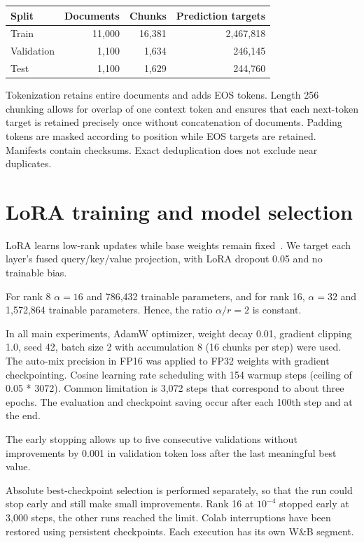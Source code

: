 \documentclass[10pt,a4paper,twocolumn]{article}
\begin{document}
\begin{center}
\begin{tabular}{@{}lrrr@{}}
\toprule
Split & Documents & Chunks & Prediction targets\\
\midrule
Train & 11,000 & 16,381 & 2,467,818\\
Validation & 1,100 & 1,634 & 246,145\\
Test & 1,100 & 1,629 & 244,760\\
\bottomrule
\end{tabular}
\end{center}

Tokenization retains entire documents and adds EOS tokens. Length 256 chunking allows for overlap of one context token and ensures that each next-token target is retained precisely once without concatenation of documents. Padding tokens are masked according to position while EOS targets are retained. Manifests contain checksums. Exact deduplication does not exclude near duplicates.

\section{LoRA training and model selection}

LoRA learns low-rank updates while base weights remain fixed~\cite{lora}. We target each layer's fused query/key/value projection, with LoRA dropout 0.05 and no trainable bias.

For rank 8 $\alpha = 16$ and 786,432 trainable parameters, and for rank 16, $\alpha = 32$ and 1,572,864 trainable parameters. Hence, the ratio $\alpha/r=2$ is constant.

In all main experiments, AdamW optimizer, weight decay 0.01, gradient clipping 1.0, seed 42, batch size 2 with accumulation 8 (16 chunks per step) were used. The auto-mix precision in FP16 was applied to FP32 weights with gradient checkpointing. Cosine learning rate scheduling with 154 warmup steps (ceiling of 0.05 * 3072). Common limitation is 3,072 steps that correspond to about three epochs. The evaluation and checkpoint saving occur after each 100th step and at the end.

The early stopping allows up to five consecutive validations without improvements by 0.001 in validation token loss after the last meaningful best value.

Absolute best-checkpoint selection is performed separately, so that the run could stop early and still make small improvements. Rank 16 at $10^{-4}$ stopped early at 3,000 steps, the other runs reached the limit. Colab interruptions have been restored using persistent checkpoints. Each execution has its own W\&B segment.
\end{document}
